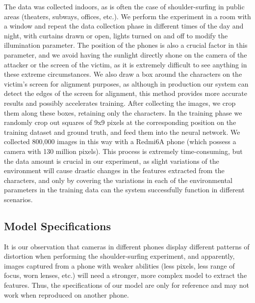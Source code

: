 The data was collected indoors, as is often the case of shoulder-surfing in public areas (theaters, subways, offices, etc.). We perform the experiment in a room with a window and repeat the data collection phase in different times of the day and night, with curtains drawn or open, lights turned on and off to modify the illumination parameter. The position of the phones is also a crucial factor in this parameter, and we avoid having the sunlight directly shone on the camera of the attacker or the screen of the victim, as it is extremely difficult to see anything in these extreme circumstances. We also draw a box around the characters on the victim's screen for alignment purposes, as although in production our system can detect the edges of the screen for alignment, this method provides more accurate results and possibly accelerates training. After collecting the images, we crop them along these boxes, retaining only the characters. In the training phase we randomly crop out squares of 9x9 pixels at the corresponding position on the training dataset and ground truth, and feed them into the neural network. We collected 800,000 images in this way with a Redmi6A phone (which possess a camera with 130 million pixels). This process is extremely time-consuming, but the data amount is crucial in our experiment, as slight variations of the environment will cause drastic changes in the features extracted from the characters, and only by covering the variations in each of the environmental parameters in the training data can the system successfully function in different scenarios.

\subsection{Model Specifications}
It is our observation that cameras in different phones display different patterns of distortion when performing the shoulder-surfing experiment, and apparently, images captured from a phone with weaker abilities (less pixels, less range of focus, worn lenses, etc.) will need a stronger, more complex model to extract the features. Thus, the specifications of our model are only for reference and may not work when reproduced on another phone.

